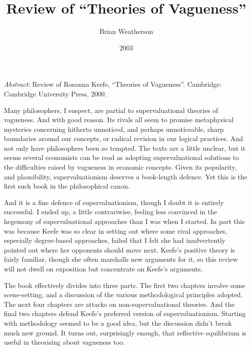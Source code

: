 \documentclass[
  11pt,
  letterpaper,
  DIV=11,
  numbers=noendperiod,
  twoside]{scrartcl}
\title{Review of ``Theories of Vagueness''}
\author{Brian Weatherson}
\date{2003}
\renewenvironment{abstract}
 {\vspace{-1.25cm}
 \quotation\small\noindent\emph{Abstract}:}
 {\endquotation}
\renewenvironment{abstract}
 {\quotation\small\noindent\emph{Abstract}:}
 {\endquotation\vspace{-0.02cm}}
\begin{document}
\maketitle
\begin{abstract}
Review of Rosanna Keefe, ``Theories of Vagueness''. Cambridge: Cambridge
University Press, 2000.
\end{abstract}


Many philosophers, I suspect, are partial to supervaluational theories
of vagueness. And with good reason. Its rivals all seem to promise
metaphysical mysteries concerning hitherto unnoticed, and perhaps
unnoticeable, sharp boundaries around our concepts, or radical revision
in our logical practices. And not only have philosophers been so
tempted. The texts are a little unclear, but it seems several economists
can be read as adopting supervaluational solutions to the difficulties
raised by vagueness in economic concepts. Given its popularity, and
plausibility, supervaluationism deserves a book-length defence. Yet this
is the first such book in the philosophical canon.

And it is a fine defence of supervaluationism, though I doubt it is
entirely successful. I ended up, a little contrariwise, feeling less
convinced in the hegemony of supervaluational approaches than I was when
I started. In part this was because Keefe was so clear in setting out
where some rival approaches, especially degree-based approaches, failed
that I felt she had inadvertently pointed out where her opponents should
move next. Keefe's positive theory is fairly familiar, though she often
marshalls new arguments for it, so this review will not dwell on
exposition but concentrate on Keefe's arguments.

The book effectively divides into three parts. The first two chapters
involve some scene-setting, and a discussion of the various
methodological principles adopted. The next four chapters are attacks on
non-supervaluational theories. And the final two chapters defend Keefe's
preferred version of supervaluationism. Starting with methodology seemed
to be a good idea, but the discussion didn't break much new ground. It
turns out, surprisingly enough, that reflective equilibrium is useful in
theorising about vagueness too.
\end{document}
